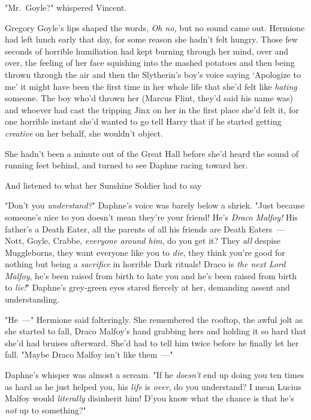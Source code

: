 "Mr.~Goyle?" whispered Vincent.

Gregory Goyle's lips shaped the words, \emph{Oh no,} but no sound came out.
\sbreak
Hermione had left lunch early that day, for some reason she hadn't felt hungry.
Those few seconds of horrible humiliation had kept burning through her mind,
over and over, the feeling of her face squishing into the mashed potatoes and
then being thrown through the air and then the Slytherin's boy's voice saying
`Apologize to me'{\el} it might have been the first time in her whole life
that she'd felt like \emph{hating} someone. The boy who'd thrown her (Marcus
Flint, they'd said his name was) and whoever had cast the tripping Jinx on her
in the first place{\el} she'd felt it, for one horrible instant she'd wanted
to go tell Harry that if he started getting \emph{creative} on her behalf, she
wouldn't object.

She hadn't been a minute out of the Great Hall before she'd heard the sound of
running feet behind, and turned to see Daphne racing toward her.

And listened to what her Sunshine Soldier had to say{\el}

"Don't you \emph{understand?}" Daphne's voice was barely below a shriek. "Just
because someone's nice to you doesn't mean they're your friend! He's
\emph{Draco Malfoy!} His father's a Death Eater, all the parents of all his
friends are Death Eaters~--- Nott, Goyle, Crabbe, \emph{everyone around him}, do
you get it? They \emph{all} despise Muggleborns, they want everyone like you to
\emph{die}, they think you're good for nothing but being a \emph{sacrifice} in
horrible Dark rituals! Draco is \emph{the next Lord Malfoy}, he's been raised
from birth to hate you and he's been raised from birth to \emph{lie!}" Daphne's
grey-green eyes stared fiercely at her, demanding assent and understanding.

"He~---" Hermione said falteringly. She remembered the rooftop, the awful jolt
as she started to fall, Draco Malfoy's hand grabbing hers and holding it so
hard that she'd had bruises afterward. She'd had to tell him twice before he
finally let her fall. "Maybe Draco Malfoy isn't like them~---"

Daphne's whisper was almost a scream. "If he \emph{doesn't} end up doing you
ten times as hard as he just helped you, his \emph{life} is \emph{over}, do you
understand? I mean Lucius Malfoy would \emph{literally} disinherit him! D'you
know what the chance is that he's \emph{not} up to something?"

